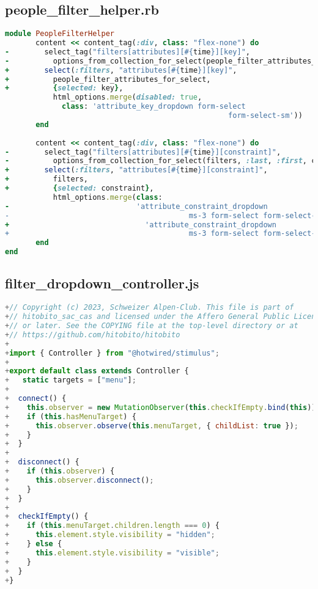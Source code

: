 \subsection{people\_filter\_helper.rb}
\begin{lstlisting}[language=Ruby]
module PeopleFilterHelper
       content << content_tag(:div, class: "flex-none") do
-        select_tag("filters[attributes][#{time}][key]",
-          options_from_collection_for_select(people_filter_attributes_for_select, :last, :first, key),
+        select(:filters, "attributes[#{time}][key]",
+          people_filter_attributes_for_select,
+          {selected: key},
           html_options.merge(disabled: true,
             class: 'attribute_key_dropdown form-select
                                                   form-select-sm'))
       end
 
       content << content_tag(:div, class: "flex-none") do
-        select_tag("filters[attributes][#{time}][constraint]",
-          options_from_collection_for_select(filters, :last, :first, constraint),
+        select(:filters, "attributes[#{time}][constraint]",
+          filters,
+          {selected: constraint},
           html_options.merge(class:
-                             'attribute_constraint_dropdown
-                                         ms-3 form-select form-select-sm'))
+                               'attribute_constraint_dropdown
+                                         ms-3 form-select form-select-sm', name: "filters[attributes][#{time}][constraint]"))
       end
end
\end{lstlisting}

\newpage

\subsection{filter\_dropdown\_controller.js}
\begin{lstlisting}[language=JavaScript]
+// Copyright (c) 2023, Schweizer Alpen-Club. This file is part of
+// hitobito_sac_cas and licensed under the Affero General Public License version 3
+// or later. See the COPYING file at the top-level directory or at
+// https://github.com/hitobito/hitobito
+
+import { Controller } from "@hotwired/stimulus";
+
+export default class extends Controller {
+   static targets = ["menu"];
+
+  connect() {
+    this.observer = new MutationObserver(this.checkIfEmpty.bind(this));
+    if (this.hasMenuTarget) {
+      this.observer.observe(this.menuTarget, { childList: true });
+    }
+  }
+
+  disconnect() {
+    if (this.observer) {
+      this.observer.disconnect();
+    }
+  }
+
+  checkIfEmpty() {
+    if (this.menuTarget.children.length === 0) {
+      this.element.style.visibility = "hidden";
+    } else {
+      this.element.style.visibility = "visible";
+    }
+  }
+}
\end{lstlisting}

